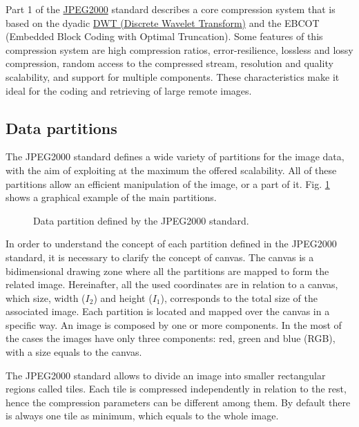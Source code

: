 Part 1 of the \href{http://www.jpeg.org/jpeg2000/}{JPEG2000} standard describes 
a core compression system that is based on the dyadic 
\href{http://en.wikipedia.org/wiki/Discrete_wavelet_transform}
{DWT (Discrete Wavelet Transform)}
and the 
EBCOT (Embedded Block Coding with Optimal Truncation). Some features of this 
compression system are high compression ratios, error-resilience, lossless 
and lossy compression, random access to the compressed stream, resolution and 
quality scalability, and support for multiple components. 
These characteristics make it ideal for the coding and retrieving of 
large remote images.

\subsection{Data partitions}

The JPEG2000 standard defines a wide variety of partitions
for the image data, with the aim of exploiting at the maximum the
offered scalability. All of these partitions
allow an efficient manipulation of the image, or a part of it. Fig. 
\ref{fig:partitions} shows a graphical example of the main partitions.

\begin{figure}[!b]
  \begin{center}
    \resizebox{0.95\textwidth}{!}{}
  \end{center}
  \caption{Data partition defined by the JPEG2000 standard.}
  \label{fig:partitions}
\end{figure}

In order to understand the concept of each partition defined
in the JPEG2000 standard, it is necessary to clarify the concept
of canvas. The canvas is a bidimensional drawing zone where
all the partitions are mapped to form the related image.
Hereinafter, all the used coordinates are in relation to 
a canvas, which size, width ($I_{2}$) and height ($I_{1}$), corresponds to
the total size of the associated image. Each partition is 
located and mapped over the canvas in a specific way.
An image is composed by one or more components. In the most
of the cases the images have only three components: red, green
and blue (RGB), with a size equals to the canvas.

The JPEG2000 standard allows to divide an image into smaller 
rectangular regions called tiles. Each tile is compressed 
independently in relation to the rest, hence the compression
parameters can be different among them. By default there is
always one tile as minimum, which equals to the whole image.

